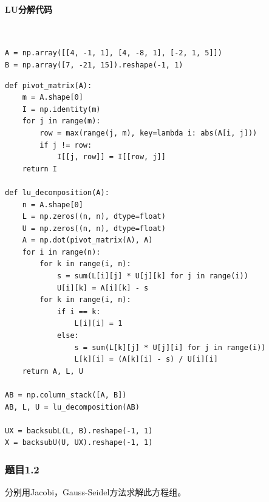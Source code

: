 \paragraph{LU分解代码}
~\\
\begin{verbatim}
A = np.array([[4, -1, 1], [4, -8, 1], [-2, 1, 5]])
B = np.array([7, -21, 15]).reshape(-1, 1)
\end{verbatim}
\begin{verbatim}
def pivot_matrix(A):
    m = A.shape[0]
    I = np.identity(m)
    for j in range(m):
        row = max(range(j, m), key=lambda i: abs(A[i, j]))
        if j != row:
            I[[j, row]] = I[[row, j]]
    return I

def lu_decomposition(A):
    n = A.shape[0]
    L = np.zeros((n, n), dtype=float)
    U = np.zeros((n, n), dtype=float)
    A = np.dot(pivot_matrix(A), A)
    for i in range(n):
        for k in range(i, n):
            s = sum(L[i][j] * U[j][k] for j in range(i))
            U[i][k] = A[i][k] - s
        for k in range(i, n):
            if i == k:
                L[i][i] = 1
            else:
                s = sum(L[k][j] * U[j][i] for j in range(i))
                L[k][i] = (A[k][i] - s) / U[i][i]
    return A, L, U

AB = np.column_stack([A, B])
AB, L, U = lu_decomposition(AB)

UX = backsubL(L, B).reshape(-1, 1)
X = backsubU(U, UX).reshape(-1, 1)
\end{verbatim}

\subsubsection{题目1.2}

分别用Jacobi，Gauss-Seidel方法求解此方程组。

